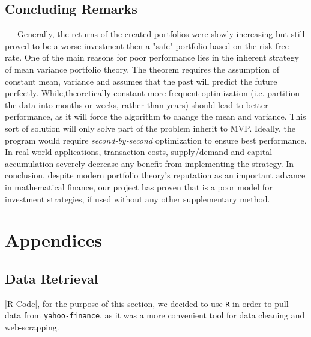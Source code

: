 \documentclass[12pt,titlepage,letter]{article}
\begin{document}
	\subsection{Concluding Remarks}
		\ \ \ Generally, the returns of the created portfolios were slowly increasing but still proved to be a worse investment then a "safe" portfolio based on the risk free rate. One of the main reasons for poor performance lies in the inherent strategy of mean variance portfolio theory. The theorem requires the assumption of constant mean, variance and assumes that the past will predict the future perfectly. While,theoretically constant more frequent optimization (i.e. partition the data into months or weeks, rather than years) should lead to better performance, as it will force the algorithm to change the mean and variance. This sort of solution will only solve part of the problem inherit to MVP. Ideally, the program would require \textit{second-by-second} optimization to ensure best performance. In real world applications, transaction costs, supply/demand and capital accumulation severely decrease any benefit from implementing the strategy.  In conclusion, despite modern portfolio theory's reputation as an important advance in mathematical finance, our project has proven that is a poor model for investment strategies, if used without any other supplementary method.
\newpage

\section{Appendices}
	\subsection{Data Retrieval}
	|R Code|, for the purpose of this section, we decided to use \verb|R| in order to pull data from \verb|yahoo-finance|, as it was a more convenient tool for data cleaning and web-scrapping.\\
	\\
\end{document}
